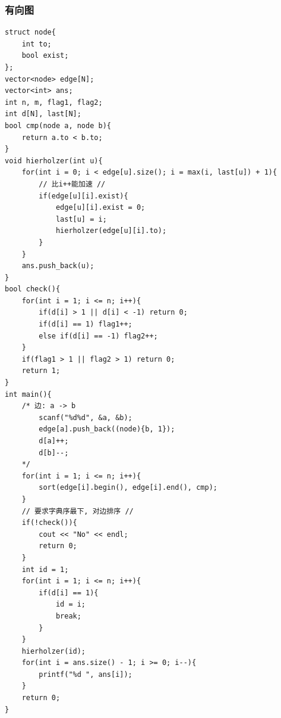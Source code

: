 \documentclass[UTF8, a4paper, titlepage, twoside]{ctexart}
\begin{document}
\subsubsection{ 有向图 }
\begin{lstlisting}[style=cpp]
struct node{
    int to;
    bool exist;
};
vector<node> edge[N];
vector<int> ans;
int n, m, flag1, flag2;
int d[N], last[N];
bool cmp(node a, node b){
    return a.to < b.to;
}
void hierholzer(int u){
    for(int i = 0; i < edge[u].size(); i = max(i, last[u]) + 1){
        // 比i++能加速 //
        if(edge[u][i].exist){
            edge[u][i].exist = 0;
            last[u] = i;
            hierholzer(edge[u][i].to);
        }
    }
    ans.push_back(u);
}
bool check(){
    for(int i = 1; i <= n; i++){
        if(d[i] > 1 || d[i] < -1) return 0;
        if(d[i] == 1) flag1++;
        else if(d[i] == -1) flag2++;
    }
    if(flag1 > 1 || flag2 > 1) return 0;
    return 1;
}
int main(){
    /* 边: a -> b
        scanf("%d%d", &a, &b);
        edge[a].push_back((node){b, 1});
        d[a]++;
        d[b]--;
    */
    for(int i = 1; i <= n; i++){
        sort(edge[i].begin(), edge[i].end(), cmp);
    }
    // 要求字典序最下, 对边排序 //
    if(!check()){
        cout << "No" << endl;
        return 0;
    }
    int id = 1;
    for(int i = 1; i <= n; i++){
        if(d[i] == 1){
            id = i;
            break;
        }
    }
    hierholzer(id);
    for(int i = ans.size() - 1; i >= 0; i--){
        printf("%d ", ans[i]);
    }
    return 0;
}
\end{lstlisting}
\end{document}
